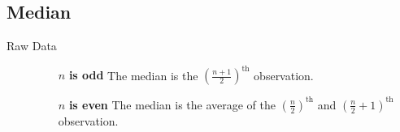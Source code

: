 \documentclass[
10pt, %
a4paper, %
]{report}
\begin{document}
\subsection*{Median}
\begin{description}
\item[Raw Data]
\begin{itemize}
\item[]
\item[\(n\) \textbf{is odd}] The median is the \(\left( \frac{n+1}{2} \right)^\text{th}\) observation.

\item[\(n\) \textbf{is even}]  The median is the average of the \(\left( \frac{n}{2} \right)^\text{th}\) and \(\left( \frac{n}{2} + 1 \right)^\text{th}\) observation.
\end{itemize}



\end{description}
\end{document}
